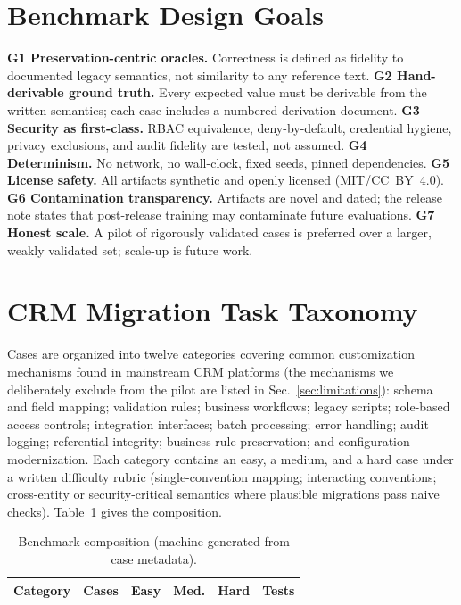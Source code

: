\documentclass[journal]{IEEEtran}
\begin{document}
\section{Benchmark Design Goals}
\label{sec:goals}
\textbf{G1 Preservation-centric oracles.} Correctness is defined as fidelity to documented
legacy semantics, not similarity to any reference text. \textbf{G2 Hand-derivable ground
truth.} Every expected value must be derivable from the written semantics; each case includes a
numbered derivation document. \textbf{G3 Security as first-class.} RBAC equivalence,
deny-by-default, credential hygiene, privacy exclusions, and audit fidelity are tested, not
assumed. \textbf{G4 Determinism.} No network, no wall-clock, fixed seeds, pinned dependencies.
\textbf{G5 License safety.} All artifacts synthetic and openly licensed (MIT/CC~BY~4.0).
\textbf{G6 Contamination transparency.} Artifacts are novel and dated; the release note states
that post-release training may contaminate future evaluations. \textbf{G7 Honest scale.} A
pilot of \NumCases{} rigorously validated cases is preferred over a larger, weakly validated
set; scale-up is future work.

\section{CRM Migration Task Taxonomy}
\label{sec:taxonomy}
Cases are organized into twelve categories covering common customization mechanisms found in
mainstream CRM platforms (the mechanisms we deliberately exclude from the pilot are listed in
Sec.~\ref{sec:limitations}): schema and field mapping; validation rules; business workflows;
legacy scripts; role-based access controls; integration interfaces; batch processing; error
handling; audit logging; referential integrity; business-rule preservation; and configuration
modernization. Each category contains an easy, a medium, and a hard case under a written
difficulty rubric (single-convention mapping; interacting conventions; cross-entity or
security-critical semantics where plausible migrations pass naive checks). Table~\ref{tab:comp}
gives the composition.

\begin{table}[t]
\caption{Benchmark composition (machine-generated from case metadata).}
\label{tab:comp}
\centering
\begin{tabular}{lccccc}
\toprule
Category & Cases & Easy & Med. & Hard & Tests \\
\midrule

\end{tabular}
\end{table}
\end{document}
